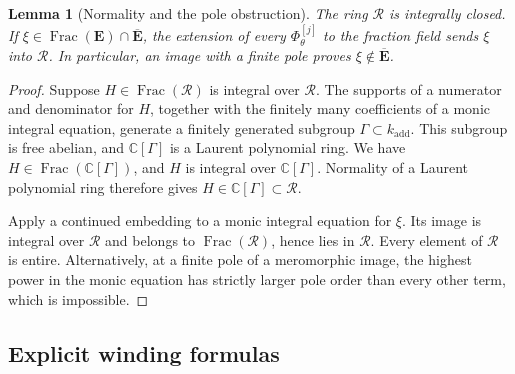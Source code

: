\documentclass[11pt]{article}
\newtheorem{lemma}[theorem]{Lemma}
\theoremstyle{definition}
\theoremstyle{remark}
\newcommand{\E}{\mathbf E}
\newcommand{\Ebar}{\overline{\mathbf E}}
\begin{document}
\begin{lemma}[Normality and the pole obstruction]\label{mbc:pole}
The ring $\mathcal R$ is integrally closed.  If
$\xi\in\operatorname{Frac}(\E)\cap\Ebar$,
the extension of every $\Phi_\theta^{[j]}$ to the fraction field
sends $\xi$ into $\mathcal R$.  In particular, an image with a
finite pole proves $\xi\notin\Ebar$.
\end{lemma}
\begin{proof}
Suppose $H\in\operatorname{Frac}(\mathcal R)$ is integral over
$\mathcal R$.  The supports of a numerator and denominator for
$H$, together with the finitely many coefficients of a monic
integral equation, generate a finitely generated subgroup
$\Gamma\subset k_{\mathrm{add}}$.  This subgroup is free abelian,
and $\mathbb C[\Gamma]$ is a Laurent polynomial ring.  We have
$H\in\operatorname{Frac}(\mathbb C[\Gamma])$, and $H$ is integral
over $\mathbb C[\Gamma]$.  Normality of a Laurent polynomial ring
therefore gives $H\in\mathbb C[\Gamma]\subset\mathcal R$.

Apply a continued embedding to a monic integral equation for
$\xi$.  Its image is integral over $\mathcal R$ and belongs to
$\operatorname{Frac}(\mathcal R)$, hence lies in $\mathcal R$.
Every element of $\mathcal R$ is entire.  Alternatively, at a
finite pole of a meromorphic image, the highest power in the
monic equation has strictly larger pole order than every other
term, which is impossible.
\end{proof}

\subsection{Explicit winding formulas}
\end{document}
